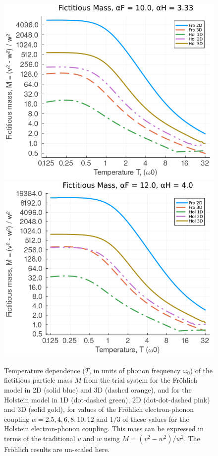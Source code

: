 \begin{figure}[!tbp]
    \includegraphics[width=.49\textwidth]{figures/mass_temp_10_333.png}
    \includegraphics[width=.49\textwidth]{figures/mass_temp_12_4.png}
    \caption{Temperature dependence ($T$, in units of phonon frequency $\omega_0$) of the fictitious particle mass $M$ from the trial system for the Fr\"ohlich model in 2D (solid blue) and 3D (dashed orange), and for the Holstein model in 1D (dot-dashed green), 2D (dot-dot-dashed pink) and 3D (solid gold), for values of the Fr\"ohlich electron-phonon coupling $\alpha = 2.5, 4, 6, 8, 10, 12$ and $1/3$ of these values for the Holstein electron-phonon coupling. This mass can be expressed in terms of the traditional $v$ and $w$ using $M = (v^2 - w^2) / w^2$. The Fr\"ohlich results are un-scaled here.}
    \label{fig:mass_temp}
\end{figure}

